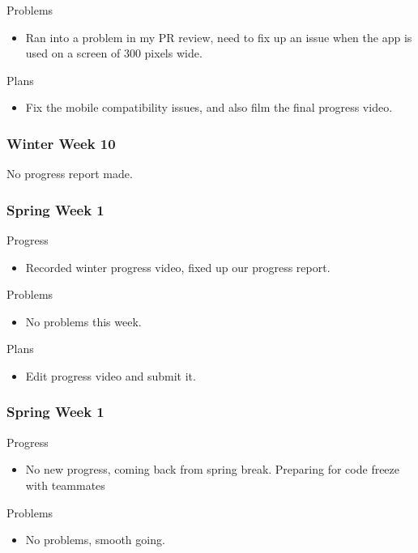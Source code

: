         \noindent
        Problems
        \begin{itemize}
            \item Ran into a problem in my PR review, need to fix up an issue when the app is used on a screen of 300 pixels wide.
        \end{itemize}
        
        \noindent
        Plans
        \begin{itemize}
            \item  Fix the mobile compatibility issues, and also film the final progress video.
        \end{itemize}
    \subsubsection{Winter Week 10}
        No progress report made.
    \subsubsection{Spring Week 1}
        \noindent
        Progress
        \begin{itemize}
            \item  Recorded winter progress video, fixed up our progress report. 
        \end{itemize}
        
        \noindent
        Problems
        \begin{itemize}
            \item No problems this week.
        \end{itemize}
        
        \noindent
        Plans
        \begin{itemize}
            \item Edit progress video and submit it.
        \end{itemize}
    \subsubsection{Spring Week 1}
        \noindent
        Progress
        \begin{itemize}
            \item No new progress, coming back from spring break. Preparing for code freeze with teammates
        \end{itemize}
        
        \noindent
        Problems
        \begin{itemize}
            \item No problems, smooth going.
        \end{itemize}
        
